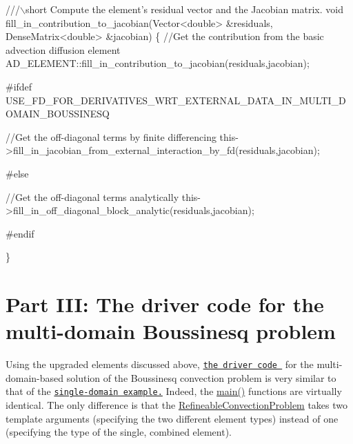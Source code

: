 \begin{DoxyCodeInclude}
 \textcolor{comment}{///\(\backslash\)short Compute the element's residual vector and the Jacobian matrix.}
 \textcolor{keywordtype}{void} fill\_in\_contribution\_to\_jacobian(Vector<double> &residuals,
                                       DenseMatrix<double> &jacobian)
 \{
  \textcolor{comment}{//Get the contribution from the basic advection diffusion element}
  AD\_ELEMENT::fill\_in\_contribution\_to\_jacobian(residuals,jacobian);
  
\textcolor{preprocessor}{#ifdef USE\_FD\_FOR\_DERIVATIVES\_WRT\_EXTERNAL\_DATA\_IN\_MULTI\_DOMAIN\_BOUSSINESQ}
  
  \textcolor{comment}{//Get the off-diagonal terms by finite differencing}
  this->fill\_in\_jacobian\_from\_external\_interaction\_by\_fd(residuals,jacobian);
  
\textcolor{preprocessor}{#else}
  
  \textcolor{comment}{//Get the off-diagonal terms analytically}
  this->fill\_in\_off\_diagonal\_block\_analytic(residuals,jacobian);
  
\textcolor{preprocessor}{#endif}
  
 \}

\end{DoxyCodeInclude}




 

\hypertarget{index_multi_domain_boussinesq}{}\section{Part I\+I\+I\+: The driver code for the multi-\/domain Boussinesq problem}\label{index_multi_domain_boussinesq}
Using the upgraded elements discussed above, \href{../../../../demo_drivers/multi_physics/boussinesq_convection/multi_domain_ref_b_convection.cc}{\tt the driver code } for the multi-\/domain-\/based solution of the Boussinesq convection problem is very similar to that of the \href{../../refine_b_convect/html/index.html}{\tt single-\/domain example.} Indeed, the {\ttfamily \hyperlink{boussinesq__convection_8cc_a3c04138a5bfe5d72780bb7e82a18e627}{main()}} functions are virtually identical. The only difference is that the {\ttfamily \hyperlink{classRefineableConvectionProblem}{Refineable\+Convection\+Problem}} takes two template arguments (specifying the two different element types) instead of one (specifying the type of the single, combined element).



